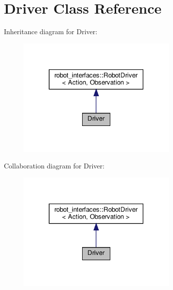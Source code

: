 \hypertarget{classDriver}{}\section{Driver Class Reference}
\label{classDriver}


Inheritance diagram for Driver\+:
\nopagebreak
\begin{figure}[H]
\begin{center}
\leavevmode
\includegraphics[width=225pt]{classDriver__inherit__graph}
\end{center}
\end{figure}


Collaboration diagram for Driver\+:
\nopagebreak
\begin{figure}[H]
\begin{center}
\leavevmode
\includegraphics[width=225pt]{classDriver__coll__graph}
\end{center}
\end{figure}
